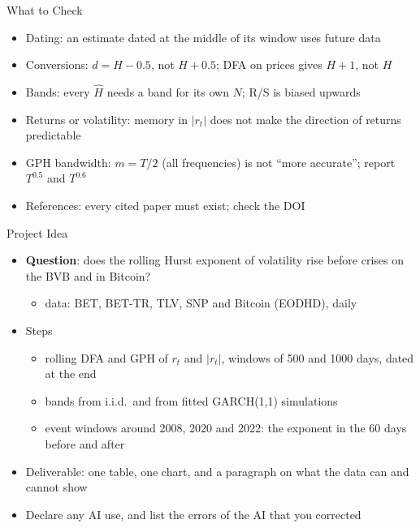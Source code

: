 \begin{frame}{What to Check}
\itemsize{\small}
\begin{itemize}
    \item Dating: an estimate dated at the middle of its window uses future data
    \item Conversions: $d = H - 0.5$, not $H + 0.5$; DFA on prices gives $H + 1$, not $H$
    \item Bands: every $\hat H$ needs a band for its own $N$; R/S is biased upwards
    \item Returns or volatility: memory in $|r_t|$ does not make the direction of returns predictable
    \item GPH bandwidth: $m = T/2$ (all frequencies) is not ``more accurate''; report $T^{0.5}$ and $T^{0.6}$
    \item References: every cited paper must exist; check the DOI
\end{itemize}
\end{frame}

\begin{frame}{Project Idea}
\itemsize{\small}
\begin{itemize}
    \item \textbf{Question}: does the rolling Hurst exponent of volatility rise before crises on the BVB and in Bitcoin?
    \begin{itemize}
        \item data: BET, BET-TR, TLV, SNP and Bitcoin (EODHD), daily
    \end{itemize}
    \item Steps
    \begin{itemize}
        \item rolling DFA and GPH of $r_t$ and $|r_t|$, windows of 500 and 1000 days, dated at the end
        \item bands from i.i.d.\ and from fitted GARCH(1,1) simulations
        \item event windows around 2008, 2020 and 2022: the exponent in the 60 days before and after
    \end{itemize}
    \item Deliverable: one table, one chart, and a paragraph on what the data can and cannot show
    \item Declare any AI use, and list the errors of the AI that you corrected
\end{itemize}
\end{frame}


